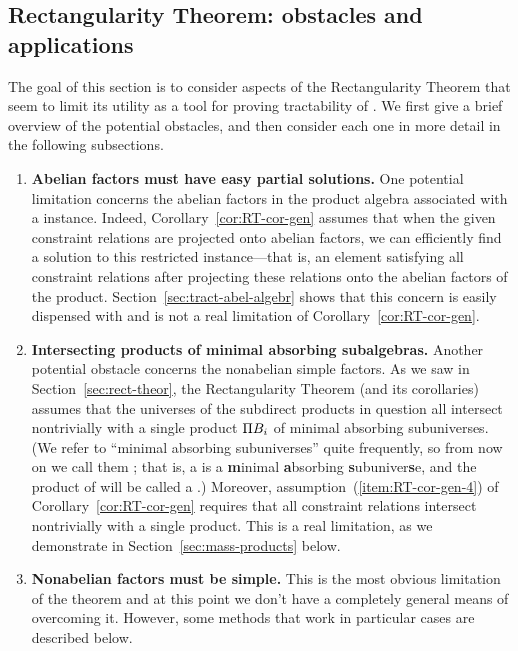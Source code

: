 \subsection{Rectangularity Theorem: obstacles and applications}
The goal of this section is to consider aspects of the Rectangularity Theorem 
that seem to limit its utility as a tool for proving tractability of \csps.
We first give a brief overview of the potential obstacles, and then consider
each one in more detail in the following subsections.
\begin{enumerate}
\item
  \label{item:abelian-potatoes-tractable}
  {\bf Abelian factors must have easy partial solutions.}
  One potential limitation concerns the abelian factors in the product 
  algebra associated with a \csp instance.
  Indeed, %
  Corollary~\ref{cor:RT-cor-gen} assumes that
  when the given constraint relations are projected onto abelian factors,
  we can efficiently find a solution to this restricted instance---that is,
  an element satisfying all constraint relations after projecting these
  relations onto the abelian factors of the product.  
  Section~\ref{sec:tract-abel-algebr} shows that this concern is easily
  dispensed with and is not a real limitation of
  Corollary~\ref{cor:RT-cor-gen}.

\item {\bf Intersecting products of minimal absorbing subalgebras.}
  Another potential obstacle concerns the nonabelian simple factors.
  As we saw in Section~\ref{sec:rect-theor}, the Rectangularity Theorem
  (and its corollaries) assumes that the universes of the subdirect
  products in question all intersect nontrivially
  with a single product $\Pi B_i$ of minimal absorbing subuniverses.
  (We refer to ``minimal absorbing subuniverses'' quite frequently, so from now
  on we call them ; that is, a  is 
  a {\bf m}inimal {\bf a}bsorbing {\bf s}ubuniver{\bf s}e, and the product of
  \masses will be called a .)
  Moreover, assumption~(\ref{item:RT-cor-gen-4}) of Corollary~\ref{cor:RT-cor-gen}
  requires that all constraint relations intersect nontrivially with a single
  \mas product. This is a real
  limitation, as we demonstrate in Section~\ref{sec:mass-products} below.

\item {\bf Nonabelian factors must be simple.}
  This is the most obvious limitation of the theorem and at this point
  we don't have a completely general means of overcoming it.  However,
  some methods that work in particular cases are described below.

\end{enumerate}


